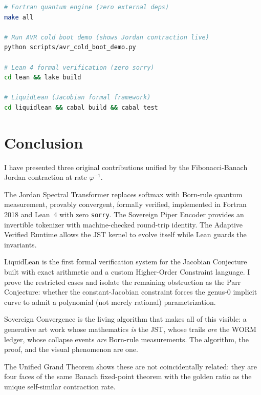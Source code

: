 \documentclass[12pt, letterpaper]{article}
\theoremstyle{plain}
\theoremstyle{definition}
\theoremstyle{remark}
\newcommand{\phiinv}{\varphi^{-1}}
\begin{document}
\begin{lstlisting}[language=bash, caption={Full reproducible build}]
# Fortran quantum engine (zero external deps)
make all

# Run AVR cold boot demo (shows Jordan contraction live)
python scripts/avr_cold_boot_demo.py

# Lean 4 formal verification (zero sorry)
cd lean && lake build

# LiquidLean (Jacobian formal framework)
cd liquidlean && cabal build && cabal test
\end{lstlisting}

\section{Conclusion}

I have presented three original contributions unified by the Fibonacci-Banach
Jordan contraction at rate $\phiinv$.

The Jordan Spectral Transformer replaces softmax with Born-rule quantum measurement,
provably convergent, formally verified, implemented in Fortran 2018 and Lean~4
with zero \texttt{sorry}. The Sovereign Piper Encoder provides an invertible
tokenizer with machine-checked round-trip identity. The Adaptive Verified Runtime
allows the JST kernel to evolve itself while Lean guards the invariants.

LiquidLean is the first formal verification system for the Jacobian Conjecture
built with exact arithmetic and a custom Higher-Order Constraint language.
I prove the restricted cases and isolate the remaining obstruction as the Parr
Conjecture: whether the constant-Jacobian constraint forces the genus-0 implicit
curve to admit a polynomial (not merely rational) parametrization.

Sovereign Convergence is the living algorithm that makes all of this visible:
a generative art work whose mathematics \textit{is} the JST, whose trails
\textit{are} the WORM ledger, whose collapse events \textit{are} Born-rule
measurements. The algorithm, the proof, and the visual phenomenon are one.

The Unified Grand Theorem shows these are not coincidentally related: they are
four faces of the same Banach fixed-point theorem with the golden ratio as the
unique self-similar contraction rate.
\end{document}
